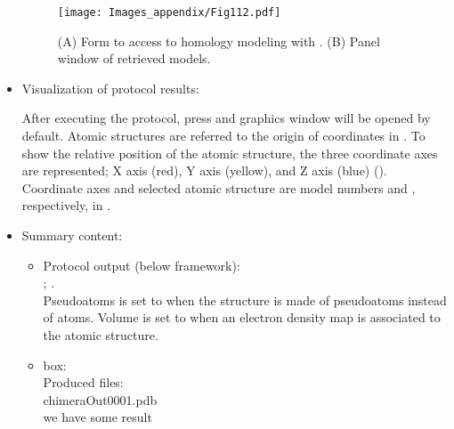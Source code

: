 \begin{itemize}
 
  \begin{figure}[H]
  \centering 
  \captionsetup{width=.7\linewidth} 
  \texttt{[image: Images\_appendix/Fig112.pdf]}
  \caption{(A) Form to access to homology modeling with \modeller. (B) Panel window of \modeller retrieved models.}
  \label{fig:app_protocol_seqHomology_2}
  \end{figure}

  \item Visualization of protocol results:
  
  After executing the protocol, press  and \chimera graphics window will be opened by default. 
  Atomic structures are referred to the origin of coordinates in \chimera . To show the relative position of the atomic structure, the three coordinate axes are represented; X axis (red), Y axis (yellow), and Z axis (blue) (). Coordinate axes and selected atomic structure  are model numbers  and , respectively, in \chimera {}.
   
   \item Summary content:
    \begin{itemize}
     \item Protocol output (below \scipion framework):\\ ; .\\Pseudoatoms is set to  when the structure is made of pseudoatoms instead of atoms. Volume is set to  when an electron density map is associated to the atomic structure.
     \item {} box:\\Produced files:\\chimeraOut0001.pdb\\we have some result
    \end{itemize}
  
  \end{itemize}
